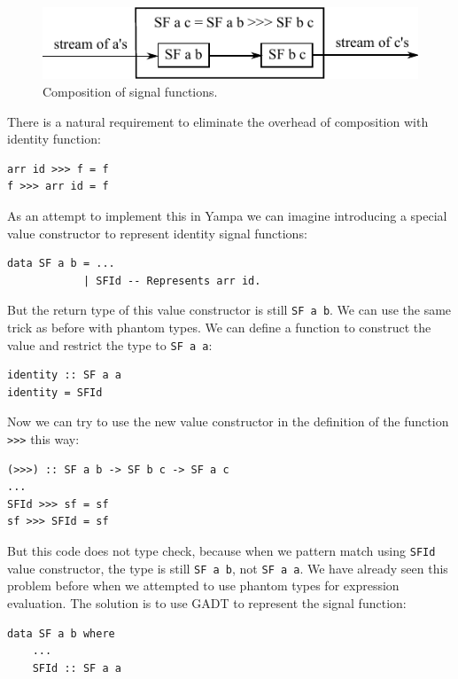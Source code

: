 \documentclass{tmr}
\begin{document}
\begin{figure}
\centering
\includegraphics{signal_composition}
\caption{Composition of signal functions.}
\label{fig:signal_composition}
\vspace{5pt}
\end{figure}

There is a natural requirement to eliminate the overhead of composition with identity function:

\begin{Verbatim}
arr id >>> f = f
f >>> arr id = f
\end{Verbatim}

As an attempt to implement this in Yampa we can imagine introducing a special value constructor to represent identity signal functions:

\begin{Verbatim}
data SF a b = ...
            | SFId -- Represents arr id.
\end{Verbatim}

But the return type of this value constructor is still \verb|SF a b|. We can use the same trick as before with phantom types. We can define a function to construct the value and restrict the type to \verb|SF a a|:

\begin{Verbatim}
identity :: SF a a
identity = SFId
\end{Verbatim}

Now we can try to use the new value constructor in the definition of the function \verb|>|\verb|>|\verb|>| this way:

\begin{Verbatim}
(>>>) :: SF a b -> SF b c -> SF a c
...
SFId >>> sf = sf
sf >>> SFId = sf
\end{Verbatim}

But this code does not type check, because when we pattern match using \verb|SFId| value constructor, the type is still \verb|SF a b|, not \verb|SF a a|. We have already seen this problem before when we attempted to use phantom types for expression evaluation. The solution is to use GADT to represent the signal function:

\begin{Verbatim}
data SF a b where
    ...
    SFId :: SF a a
\end{Verbatim}
\end{document}
